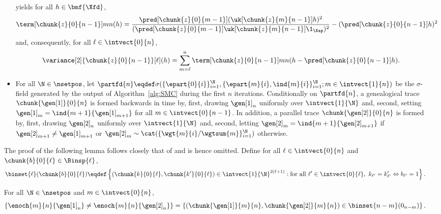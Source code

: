\begin{itemize}
$$$$
yields for all $h \in \bmf{\Xfd}$, 
$$
\term[\chunk{z}{0}{n - 1}]{m}{n}(h) = \frac{\pred[\chunk{z}{0}{m - 1}] (\uk[\chunk{z}{m}{n - 1}] h)^2}{(\pred[\chunk{z}{0}{m - 1}] \uk[\chunk{z}{m}{n - 1}] \1_{\Xsp})^2} - (\pred[\chunk{z}{0}{n - 1}] h)^2 
$$
and, consequently, for all $\ell \in \intvect{0}{n}$, 
\begin{equation} \label{eq:variance:alt:expression}
\variance[2]{\chunk{z}{0}{n - 1}}[\ell](h) = \sum_{m = \ell}^n \term[\chunk{z}{0}{n - 1}]{m}{n} (h - \pred[\chunk{z}{0}{n - 1}] h). 
\end{equation}
\item For all $\N \in \nsetpos$, let $\partfd{n} \eqdef \sigma( \{ \epart{0}{i} \}_{i = 1}^\N, \{\epart{m}{i}, \ind{m}{i} \}_{i = 1}^\N ; m \in \intvect{1}{n} )$ be the $\sigma$-field generated by the output of Algorithm~\ref{alg:SMC} during the first $n$ iterations. Conditionally on $\partfd{n}$, a genealogical trace $\chunk{\gen[1]}{0}{n}$ is formed backwards in time by, first, drawing $\gen[1]_n$ uniformly over $\intvect{1}{\N}$ and, second, setting $\gen[1]_m = \ind{m + 1}{\gen[1]_{m + 1}}$ for all $m \in \intvect{0}{n - 1}$. In addition, a parallel trace $\chunk{\gen[2]}{0}{n}$ is formed by, first, drawing $\gen[2]_n$ uniformly over $\intvect{1}{\N}$ and, second, letting $\gen[2]_m = \ind{m + 1}{\gen[2]_{m + 1}}$ if $\gen[2]_{m + 1} \neq \gen[1]_{m + 1}$ or $\gen[2]_m \sim \cat(\{ \wgt{m}{i} / \wgtsum{m} \}_{i = 1}^\N)$ otherwise. 
\end{itemize}

The proof of the following lemma follows closely that of \cite[Lemma~4]{lee:whiteley:2016} and is hence omitted. Define for all $\ell \in \intvect{0}{n}$ and $\chunk{b}{0}{\ell} \in \Binsp{\ell}$, 
$$
\binset{\ell}(\chunk{b}{0}{\ell}) \eqdef \left \{(\chunk{k}{0}{\ell}, \chunk{k'}{0}{\ell}) \in \intvect{1}{\N}^{2(\ell + 1)} : \mbox{for all } \ell' \in \intvect{0}{\ell}, \ k_{\ell'} = k'_{\ell'} \Leftrightarrow b_{\ell'} = 1 \right \}. 
$$
\begin{lemma} \label{lemma:equiv:sets}
For all $\N \in \nsetpos$ and $m \in \intvect{0}{n}$, 
$$
\left \{ \enoch{m}{n}{\gen[1]_n} \neq \enoch{m}{n}{\gen[2]_n} \right \} = \left \{ (\chunk{\gen[1]}{m}{n}, \chunk{\gen[2]}{m}{n}) \in \binset{n - m}(0_{n - m}) \right \}. 
$$ 
\end{lemma}

